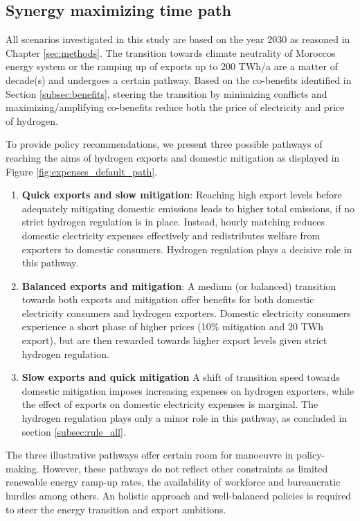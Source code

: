 \subsection{Synergy maximizing time path}
\label{subsec:timepath}
All scenarios investigated in this study are based on the year 2030 as reasoned in Chapter \ref{sec:methods}. The transition towards climate neutrality of Moroccos energy system or the ramping up of exports up to 200 TWh/a are a matter of decade(s) and undergoes a certain pathway. Based on the co-benefits identified in Section \ref{subsec:benefits}, steering the transition by minimizing conflicts and maximizing/amplifying co-benefits reduce both the price of electricity and price of hydrogen. 

To provide policy recommendations, we present three possible pathways of reaching the aims of hydrogen exports and domestic mitigation as displayed in Figure \ref{fig:expenses_default_path}.
\begin{enumerate}
    \item \textbf{Quick exports and slow mitigation}: Reaching high export levels before adequately mitigating domestic emissions leads to higher total emissions, if no strict hydrogen regulation is in place. Instead, hourly matching reduces domestic electricity expenses effectively and redistributes welfare from exporters to domestic consumers. Hydrogen regulation plays a decisive role in this pathway.
    \item \textbf{Balanced exports and mitigation}: A medium (or balanced) transition towards both exports and mitigation offer benefits for both domestic electricity consumers and hydrogen exporters. Domestic electricity consumers experience a short phase of higher prices (10\% mitigation and 20 TWh export), but are then rewarded towards higher export levels given strict hydrogen regulation.
    \item \textbf{Slow exports and quick mitigation} A shift of transition speed towards domestic mitigation imposes increasing expenses on hydrogen exporters, while the effect of exports on domestic electricity expenses is marginal. The hydrogen regulation plays only a minor role in this pathway, as concluded in section \ref{subsec:rule_all}.
\end{enumerate}

The three illustrative pathways offer certain room for manoeuvre in policy-making. However, these pathways do not reflect other constraints as limited renewable energy ramp-up rates, the availability of workforce and bureaucratic hurdles among others. An holistic approach and well-balanced policies is required to steer the energy transition and export ambitions.


